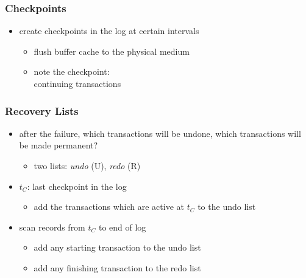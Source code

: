 \documentclass[dvipsnames]{beamer}
\theoremstyle{plain}
\begin{document}
\begin{frame}
  \frametitle{Checkpoints}

  \begin{itemize}
    \item create \alert{checkpoints} in the log at certain intervals
    \begin{itemize}
      \item flush buffer cache to the physical medium
      \item note the checkpoint:\\
        continuing transactions
    \end{itemize}
  \end{itemize}
\end{frame}

\begin{frame}
  \frametitle{Recovery Lists}

  \begin{itemize}
    \item after the failure, which transactions will be undone, which
      transactions will be made permanent?
    \begin{itemize}
      \item two lists: \emph{undo} (U), \emph{redo} (R)
    \end{itemize}

    \pause
    \item $t_C$: last checkpoint in the log
    \begin{itemize}
      \item add the transactions which are active at $t_C$ to the undo list
    \end{itemize}

    \pause
    \item scan records from $t_C$ to end of log
    \begin{itemize}
      \item add any starting transaction to the undo list
      \item add any finishing transaction to the redo list
    \end{itemize}
  \end{itemize}
\end{frame}
\end{document}
